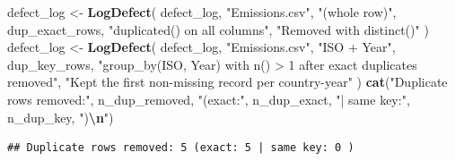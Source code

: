 \documentclass[
]{article}
\newenvironment{Shaded}{\begin{snugshade}}{\end{snugshade}}
\newcommand{\FunctionTok}[1]{\textcolor[rgb]{0.13,0.29,0.53}{\textbf{#1}}}
\newcommand{\NormalTok}[1]{#1}
\newcommand{\OtherTok}[1]{\textcolor[rgb]{0.56,0.35,0.01}{#1}}
\newcommand{\SpecialCharTok}[1]{\textcolor[rgb]{0.81,0.36,0.00}{\textbf{#1}}}
\newcommand{\StringTok}[1]{\textcolor[rgb]{0.31,0.60,0.02}{#1}}
\begin{document}
\begin{Shaded}
\begin{Highlighting}[]
\NormalTok{defect\_log }\OtherTok{\textless{}{-}} \FunctionTok{LogDefect}\NormalTok{(}
\NormalTok{  defect\_log, }\StringTok{"Emissions.csv"}\NormalTok{, }\StringTok{"(whole row)"}\NormalTok{, dup\_exact\_rows,}
  \StringTok{"duplicated() on all columns"}\NormalTok{, }\StringTok{"Removed with distinct()"}
\NormalTok{)}
\NormalTok{defect\_log }\OtherTok{\textless{}{-}} \FunctionTok{LogDefect}\NormalTok{(}
\NormalTok{  defect\_log, }\StringTok{"Emissions.csv"}\NormalTok{, }\StringTok{"ISO + Year"}\NormalTok{, dup\_key\_rows,}
  \StringTok{"group\_by(ISO, Year) with n() \textgreater{} 1 after exact duplicates removed"}\NormalTok{,}
  \StringTok{"Kept the first non{-}missing record per country{-}year"}
\NormalTok{)}
\FunctionTok{cat}\NormalTok{(}\StringTok{"Duplicate rows removed:"}\NormalTok{, n\_dup\_removed,}
    \StringTok{"(exact:"}\NormalTok{, n\_dup\_exact, }\StringTok{"| same key:"}\NormalTok{, n\_dup\_key, }\StringTok{")}\SpecialCharTok{\textbackslash{}n}\StringTok{"}\NormalTok{)}
\end{Highlighting}
\end{Shaded}

\begin{verbatim}
## Duplicate rows removed: 5 (exact: 5 | same key: 0 )
\end{verbatim}
\end{document}
